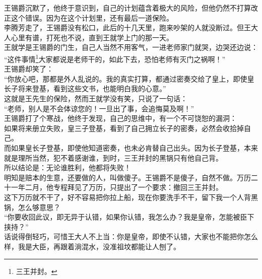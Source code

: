 \begin{multicols}{\theparacolNo}
王锡爵沉默了，他终于意识到，自己的计划蕴含着极大的风险，但他仍然不打算改正这个错误。因为在这个计划里，还有最后一道保险。\\

李腾芳走了，王锡爵没有松口，此后的十几天里，跑来吵架的人就没断过。但王大人心里有谱，打死也不说，直到王就学上门的那一天。\\

王就学是王锡爵的门生，自己人当然不用客气，一进老师家门就哭，边哭还边说：\\

“这件事情\footnote{三王并封。}大家都说是老师干的，如此下去，恐怕老师有灭门之祸啊！”\\

王锡爵却笑了：\\

“你放心吧，那都是外人乱说的。我的真实打算，都通过密奏交给了皇上，即使皇长子将来登基，看到这些文书，也能明白我的心意。”\\

这就是王先生的保险，然而王就学没有笑，只说了一句话：\\

“老师，别人是不会体谅您的！一旦出了事，会追悔莫及啊！”\\

王锡爵打了个寒战，他终于发现，自己的思维中，有一个不可饶恕的漏洞：\\

如果将来册立失败，皇三子登基，看到了自己拥立长子的密奏，必然会收拾掉自己。\\

而如果皇长子登基，即使他知道密奏，也未必肯替自己出头。因为长子登基，本来就是理所当然，犯不着感谢谁，到时，三王并封的黑锅只有他自己背。\\

所以结论是：无论谁胜利，他都将失败！\\

明知是赔本的生意，还要做的人，叫做傻子。王锡爵不是傻子，自然不做。万历二十一年二月，他专程拜见了万历，只提出了一个要求：撤回三王并封。\\

这下万历就不干了，好不容易把你拉上船，现在你要洗手不干，留下我一个人背黑锅，怎么够意思？\\

“你要收回此议，即无异于认错，如果你认错，我怎么办？我是皇帝，怎能被臣下挟持？”\\

话说得倒轻巧，可惜王大人不上当：你是皇帝，即使不认错，大家也不能把你怎么样，我是大臣，再跟着淌混水，没准祖坟都能让人刨了。\\


\end{multicols}
